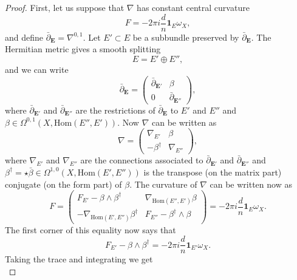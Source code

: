 \documentclass[12pt,a4paper]{book}
\theoremstyle{definition} \newtheorem{defn}[thm]{Definition}
\theoremstyle{definition} \newtheorem{ejemplo}[thm]{Example}
\theoremstyle{remark} \newtheorem*{rem}{Remark}
\def\id{\mathbf{1}}
\def\Hom{\mathrm{Hom}}
\def\delbar{\bar{\partial}}
\newcommand{\ve}[1]{\mathbf{#1}}
\begin{document}
\begin{proof}
First, let us suppose that $\nabla$ has constant central curvature
\begin{equation*}
  F=-2\pi i \frac{d}{n} \id_E \omega_X,
\end{equation*}
and define $\delbar_{\ve{E}}=\nabla^{0,1}$. Let $E'\subset E$ be a subbundle preserved by $\delbar_{\ve{E}}$. The Hermitian metric gives a smooth splitting
\begin{equation*}
  E=E'\oplus E'',
\end{equation*}
and we can write
\begin{equation*}
  \delbar_{\ve{E}}=\left(
  \begin{array}{cc}
    \delbar_{\ve{E}'} & \beta \\
    0 & \delbar_{\ve{E}''}
  \end{array}\right),
\end{equation*}
where $\delbar_{\ve{E}'}$ and $\delbar_{\ve{E}''}$ are the restrictions of $\delbar_{\ve{E}}$ to $E'$ and $E''$ and $\beta \in \Omega^{0,1}(X,\Hom (E'',E'))$. Now $\nabla$ can be written as
\begin{equation*}
  \nabla=\left(
  \begin{array}{cc}
    \nabla_{E'} & \beta \\
    -\beta^\dagger & \nabla_{E''}
  \end{array}\right),
\end{equation*}
where $\nabla_{E'}$ and $\nabla_{E''}$ are the connections associated to $\delbar_{\ve{E}'}$ and $\delbar_{\ve{E}''}$ and $\beta^\dagger=\star \bar{\beta} \in \Omega^{1,0}(X,\Hom(E',E''))$ is the transpose (on the matrix part) conjugate (on the form part) of $\beta$. The curvature of $\nabla$ can be written now as
\begin{equation*}
  F=\left(
  \begin{array}{cc}
    F_{E'}-\beta\wedge \beta^\dagger & \nabla_{\Hom(E'',E')}\beta \\
    -\nabla_{\Hom (E',E'')}\beta^\dagger & F_{E''}-\beta^\dagger \wedge \beta
  \end{array}\right)=-2\pi i\frac{d}{n} \id_E \omega_X.
\end{equation*}
The first corner of this equality now says that
\begin{equation*}
  F_{E'}-\beta \wedge \beta^\dagger = -2\pi i \frac{d}{n} \id_{E'} \omega_X.
\end{equation*}
Taking the trace and integrating we get
\begin{equation*}

\end{equation*}
\end{proof}
\end{document}
